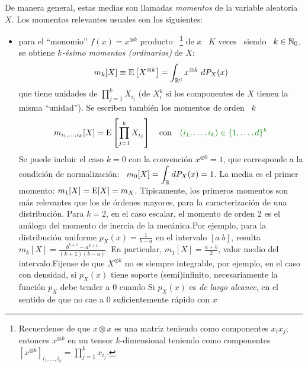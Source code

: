 De  manera general,  estas medias  son llamadas  {\it momentos}  de  la variable
aleatoria $X$. Los momentos relevantes usuales son los siguientes:
%
\begin{itemize}
\item    para    el    ``monomio''    $f(x)   =    x^{\otimes    k}$    producto
  ~\footnote{Recuerdense  de  que $x  \otimes  x$  es una  matriz
    teniendo como componentes  $x_i x_j$; entonces $x^{\otimes k}$  en un tensor
    $k$-dimensional teniendo como  componentes $ \displaystyle \left[ x^{\otimes
        k}  \right]_{i_1,\ldots,i_k} =  \prod_{j=1}^k x_{i_j}$.}
   de $x$  \ $K$
  veces \ siendo \ $k \in \mathbb{N}_0$, se obtiene  $k${\it-\'esimo momentos (ordinarios)} de $X$:
  \[
  m_k[X] \equiv \operatorname{E}\left[  X^{\otimes k} \right] = \int_{\mathbb{R}^d}  x^{\otimes k} \
  dP_X(x)
  \]
  que tiene unidades de $\prod_{j=1}^k X_{i_j}$  (de $X_i^k$ si los componentes de $X$
  tienen la  misma ``unidad'').  Se escriben  tambi\'en los momentos  de orden \
  $k$ \ 
  \[
  m_{i_1,\ldots,i_k}[X]  =  \Esp\left[   \prod_{j=1}^k  X_{i_j}  \right]  \quad
  \mbox{con} \quad \modif{(i_1 , \ldots , i_k) \in \{ 1 , \ldots , d \}^k }
  \]
    Se puede  incluir el caso $k=0$
  con la convenci\'on  $x^{\otimes 0} = 1$, que corresponde  a la condici\'on de
  normalizaci\'on: \ $\displaystyle m_0[X] =  \int_{\mathbb{R}} dP_X(x) = 1$.  La media
  es el primer  momento: $m_1[X] = \operatorname{E}[X] =  m_X$.  T\'ipicamente, los primeros
  momentos  son  m\'as  relevantes  que   los  de  \'ordenes  mayores,  para  la
  caracterizaci\'on de una distribuci\'on.  Para $k = 2$, en el caso escalar, el
  momento  de   orden  2  es  el   an\'alogo  del  momento  de   inercia  de  la
  mec\'anica.\newline  Por ejemplo,  para la  distribuci\'on uniforme  $p_X(x) =
  \frac{1}{b-a}$   en  el   intervalo   $[   a  \;   b]$,   resulta  $m_k[X]   =
  \frac{b^{k+1}-a^{k+1}}{(k+1)(b-a)}$.  En particular, $m_1[X] = \frac{a+b}{2}$,
  valor  medio del  intervalo.\newline  Fijense  de que  $X^{\otimes  k}$ no  es
  siempre integrable,  por ejemplo, en el  caso con densidad,  si $p_X(x)$ tiene
  soporte (semi)infinito,  necesariamente la funci\'on  $p_X$ debe tender  a $0$
  cuando \modif{$\|  x \|  \rightarrow \infty$.}  Si  $p_X(x)$ es {\it  de largo
    alcance}, en el sentido de que no cae a $0$ suficientemente r\'apido con $x$

\end{itemize}
